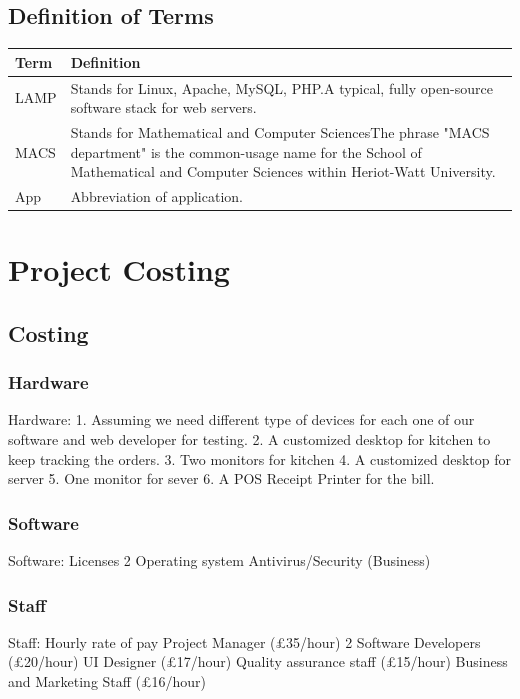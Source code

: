 \documentclass[11pt, a4paper]{report}
\begin{document}
\pagebreak

\section{Definition of Terms}
\vspace{1cm}

\begin{tabulary}{1.2\textwidth}{l L}
Term & Definition \\ \midrule

LAMP & Stands for Linux, Apache, MySQL, PHP.\newline A typical, fully open-source software stack for web servers. \\ \midrule
MACS & Stands for Mathematical and Computer Sciences\newline The phrase "MACS department" is the common-usage name for the School of Mathematical and Computer Sciences within Heriot-Watt University. \\ \midrule
App & Abbreviation of application.
\end{tabulary}

\chapter{Project Costing} 
\pagebreak 
\minitoc
\pagebreak
\section{Costing} 
\subsection{Hardware} 
Hardware:
1.	Assuming we need different type of devices for each one of our software and web developer for testing.
2.	A customized desktop for kitchen to keep tracking the orders.
3.	Two monitors for kitchen
4.	A customized desktop for server
5.	One monitor for sever
6.	A POS Receipt Printer for the bill.
\subsection{Software} 
Software:
Licenses
2 Operating system
Antivirus/Security (Business)
\subsection{Staff} 
Staff:
Hourly rate of pay
Project Manager			(£35/hour)
2 Software Developers			(£20/hour)
UI Designer				(£17/hour)
Quality assurance staff		(£15/hour)
Business and Marketing Staff		(£16/hour)
\end{document}
